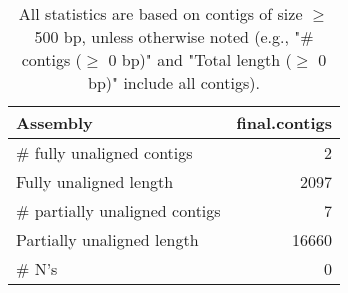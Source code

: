 \documentclass[12pt,a4paper]{article}
\begin{document}
\begin{table}[ht]
\begin{center}
\caption{All statistics are based on contigs of size $\geq$ 500 bp, unless otherwise noted (e.g., "\# contigs ($\geq$ 0 bp)" and "Total length ($\geq$ 0 bp)" include all contigs).}
\begin{tabular}{|l*{1}{|r}|}
\hline
Assembly & final.contigs \\ \hline
\# fully unaligned contigs & 2 \\ \hline
Fully unaligned length & 2097 \\ \hline
\# partially unaligned contigs & 7 \\ \hline
Partially unaligned length & 16660 \\ \hline
\# N's & 0 \\ \hline
\end{tabular}
\end{center}
\end{table}
\end{document}
